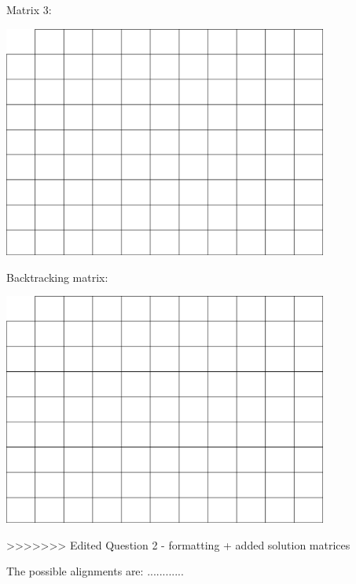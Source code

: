 \documentclass[a4paper,11pt]{article}
\begin{document}
Matrix 3: 
\begin{center}
\includegraphics[width=0.8\textwidth]{matrix.png}
\end{center}
\vspace{0.5cm}

Backtracking matrix:
\begin{center}
\includegraphics[width=0.8\textwidth]{matrix.png}
\end{center}
\vspace{0.5cm}
>>>>>>> Edited Question 2 - formatting + added solution matrices

The possible alignments are: ............
\end{document}
